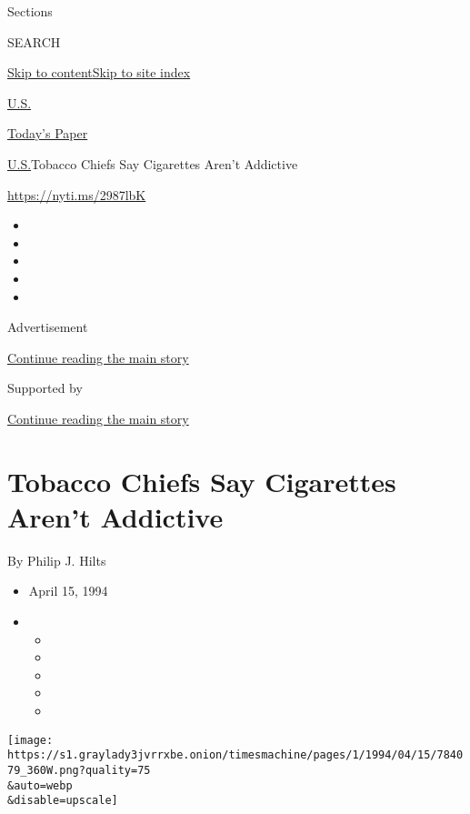 Sections

SEARCH

\protect\hyperlink{site-content}{Skip to
content}\protect\hyperlink{site-index}{Skip to site index}

\href{https://www.nytimes3xbfgragh.onion/section/us}{U.S.}

\href{https://myaccount.nytimes3xbfgragh.onion/auth/login?response_type=cookie\&client_id=vi}{}

\href{https://www.nytimes3xbfgragh.onion/section/todayspaper}{Today's
Paper}

\href{/section/us}{U.S.}\textbar{}Tobacco Chiefs Say Cigarettes Aren't
Addictive

\href{https://nyti.ms/2987lbK}{https://nyti.ms/2987lbK}

\begin{itemize}
\item
\item
\item
\item
\item
\end{itemize}

Advertisement

\protect\hyperlink{after-top}{Continue reading the main story}

Supported by

\protect\hyperlink{after-sponsor}{Continue reading the main story}

\hypertarget{tobacco-chiefs-say-cigarettes-arent-addictive}{%
\section{Tobacco Chiefs Say Cigarettes Aren't
Addictive}\label{tobacco-chiefs-say-cigarettes-arent-addictive}}

By Philip J. Hilts

\begin{itemize}
\item
  April 15, 1994
\item
  \begin{itemize}
  \item
  \item
  \item
  \item
  \item
  \end{itemize}
\end{itemize}

\texttt{[image: https://s1.graylady3jvrrxbe.onion/timesmachine/pages/1/1994/04/15/784079\_360W.png?quality=75\\\&auto=webp\\\&disable=upscale]}

